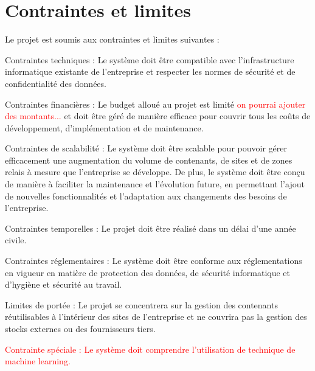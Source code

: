 \section{Contraintes et limites}

Le projet est soumis aux contraintes et limites suivantes :\\

\begin{itemize}
    \item[$\bullet$] Contraintes techniques : Le système doit être compatible avec l'infrastructure informatique existante de l'entreprise et respecter les normes de sécurité et de confidentialité des données.
    \item[$\bullet$] Contraintes financières : Le budget alloué au projet est limité \textcolor{red}{on pourrai ajouter des montants...} et doit être géré de manière efficace pour couvrir tous les coûts de développement, d'implémentation et de maintenance.
	\item[$\bullet$] Contraintes de scalabilité : Le système doit être scalable pour pouvoir gérer efficacement une augmentation du volume de contenants, de sites et de zones relais à mesure que l'entreprise se développe. De plus, le système doit être conçu de manière à faciliter la maintenance et l'évolution future, en permettant l'ajout de nouvelles fonctionnalités et l'adaptation aux changements des besoins de l'entreprise.
    \item[$\bullet$] Contraintes temporelles : Le projet doit être réalisé dans un délai d'une année civile.
    \item[$\bullet$] Contraintes réglementaires : Le système doit être conforme aux réglementations en vigueur en matière de protection des données, de sécurité informatique et d'hygiène et sécurité au travail.
    \item[$\bullet$] Limites de portée : Le projet se concentrera sur la gestion des contenants réutilisables à l'intérieur des sites de l'entreprise et ne couvrira pas la gestion des stocks externes ou des fournisseurs tiers.
    \textcolor{red}{\item[$\bullet$] Contrainte spéciale : Le système doit comprendre l'utilisation de technique de machine learning.}\\
\end{itemize}


